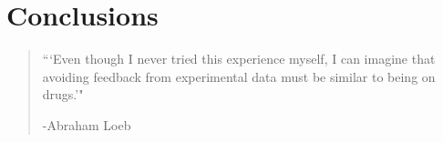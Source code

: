 \chapter{Conclusions}
\label{chap:Conclusions}


\begin{quotation}

\begin{flushright}
\begin{minipage}[t][5cm][b]{0.5\textwidth}
{ ```Even though I never tried this experience myself, I can imagine that avoiding feedback from experimental data must be similar to being on drugs.'"}

\bigskip

-{\small  Abraham Loeb}
\end{minipage}
\end{flushright}

\vspace{0.5cm}
\end{quotation}